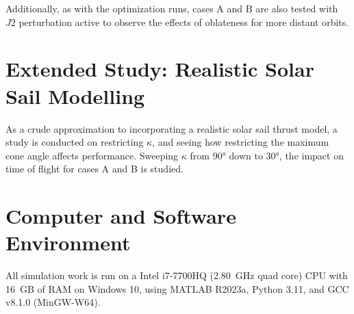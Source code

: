 Additionally, as with the optimization runs, cases A and B are also tested with \(J2\) perturbation active to observe the effects of oblateness for more distant orbits.

\section{Extended Study: Realistic Solar Sail Modelling}
As a crude approximation to incorporating a realistic solar sail thrust model, a study is conducted on restricting \(\kappa\), and seeing how restricting the maximum cone angle affects performance. Sweeping \(\kappa\) from \ang{90} down to \ang{30}, the impact on time of flight for cases A and B is studied.

\section{Computer and Software Environment}
All simulation work is run on a Intel i7-7700HQ (\qty{2.80}{GHz} quad core) CPU with \qty{16}{GB} of RAM on Windows 10, using MATLAB R2023a, Python 3.11, and GCC v8.1.0 (MinGW-W64).

